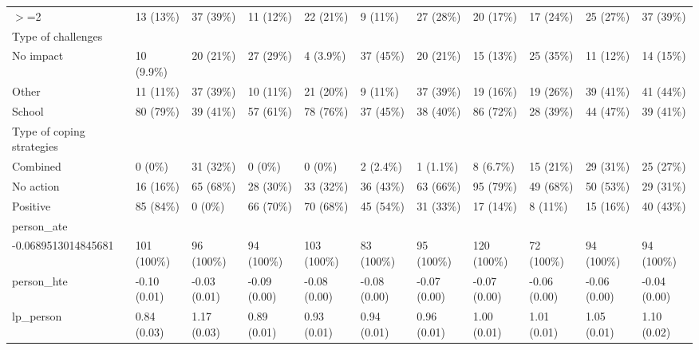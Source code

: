 \begin{table}[ht]
\begin{tabular}{lllllllllll}
  $>$=2 & 13 (13\%) & 37 (39\%) & 11 (12\%) & 22 (21\%) & 9 (11\%) & 27 (28\%) & 20 (17\%) & 17 (24\%) & 25 (27\%) & 37 (39\%) \\ 
  Type of challenges &  &  &  &  &  &  &  &  &  &  \\ 
  No impact & 10 (9.9\%) & 20 (21\%) & 27 (29\%) & 4 (3.9\%) & 37 (45\%) & 20 (21\%) & 15 (13\%) & 25 (35\%) & 11 (12\%) & 14 (15\%) \\ 
  Other & 11 (11\%) & 37 (39\%) & 10 (11\%) & 21 (20\%) & 9 (11\%) & 37 (39\%) & 19 (16\%) & 19 (26\%) & 39 (41\%) & 41 (44\%) \\ 
  School & 80 (79\%) & 39 (41\%) & 57 (61\%) & 78 (76\%) & 37 (45\%) & 38 (40\%) & 86 (72\%) & 28 (39\%) & 44 (47\%) & 39 (41\%) \\ 
  Type of coping strategies &  &  &  &  &  &  &  &  &  &  \\ 
  Combined & 0 (0\%) & 31 (32\%) & 0 (0\%) & 0 (0\%) & 2 (2.4\%) & 1 (1.1\%) & 8 (6.7\%) & 15 (21\%) & 29 (31\%) & 25 (27\%) \\ 
  No action & 16 (16\%) & 65 (68\%) & 28 (30\%) & 33 (32\%) & 36 (43\%) & 63 (66\%) & 95 (79\%) & 49 (68\%) & 50 (53\%) & 29 (31\%) \\ 
  Positive & 85 (84\%) & 0 (0\%) & 66 (70\%) & 70 (68\%) & 45 (54\%) & 31 (33\%) & 17 (14\%) & 8 (11\%) & 15 (16\%) & 40 (43\%) \\ 
  person\_ate &  &  &  &  &  &  &  &  &  &  \\ 
  -0.0689513014845681 & 101 (100\%) & 96 (100\%) & 94 (100\%) & 103 (100\%) & 83 (100\%) & 95 (100\%) & 120 (100\%) & 72 (100\%) & 94 (100\%) & 94 (100\%) \\ 
  person\_hte & -0.10 (0.01) & -0.03 (0.01) & -0.09 (0.00) & -0.08 (0.00) & -0.08 (0.00) & -0.07 (0.00) & -0.07 (0.00) & -0.06 (0.00) & -0.06 (0.00) & -0.04 (0.00) \\ 
  lp\_person & 0.84 (0.03) & 1.17 (0.03) & 0.89 (0.01) & 0.93 (0.01) & 0.94 (0.01) & 0.96 (0.01) & 1.00 (0.01) & 1.01 (0.01) & 1.05 (0.01) & 1.10 (0.02) \\ 
   \hline
\end{tabular}
\end{table}

